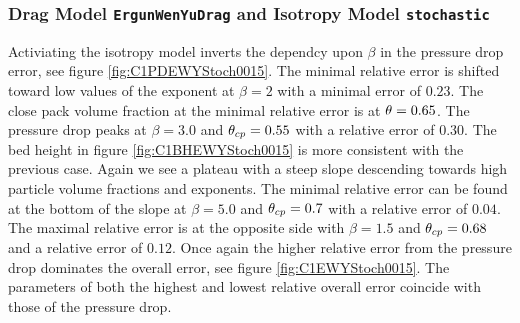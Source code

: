 \subsubsection{Drag Model \lstinline|ErgunWenYuDrag| and Isotropy Model \lstinline|stochastic|}
Activiating the isotropy model inverts the dependcy upon $\beta$ in the pressure drop error, see figure \ref{fig:C1PDEWYStoch0015}.
The minimal relative error is shifted toward low values of the exponent at $\beta = 2$ with a minimal error of $0.23$. The close pack volume fraction at the minimal relative error is at $\theta = 0.65$.
The pressure drop peaks at $\beta = 3.0$ and $\theta_{cp} = 0.55$ with a relative error of $0.30$. 
The bed height in figure \ref{fig:C1BHEWYStoch0015} is more consistent with the previous case. Again we see a plateau with a steep slope descending towards high particle volume fractions and exponents.
The minimal relative error can be found at the bottom of the slope at $\beta = 5.0$ and $\theta_{cp} = 0.7$ with a relative error of $0.04$.
The maximal relative error is at the opposite side with $\beta = 1.5$ and $\theta_{cp} = 0.68$ and a relative error of $0.12$.
Once again the higher relative error from the pressure drop dominates the overall error, see figure \ref{fig:C1EWYStoch0015}.
The parameters of both the highest and lowest relative overall error coincide with those of the pressure drop.


